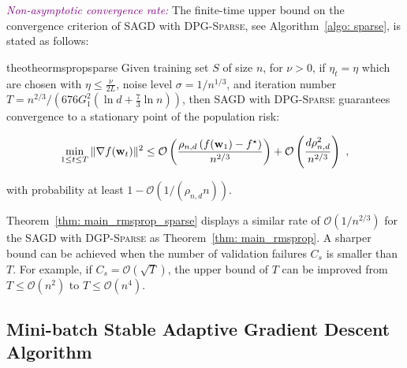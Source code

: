 \documentclass[11pt]{article}
\begin{document}
\textcolor{purple}{\textit{Non-asymptotic convergence rate:}}
The finite-time upper bound on the convergence criterion of \textsc{SAGD} with \textsc{DPG-Sparse}, see Algorithm~\ref{algo: sparse}, is stated as follows:
\begin{restatable}{theo}{theormspropsparse}
\label{thm: main_rmsprop_sparse}
 Given training set $S$ of size $n$, for $\nu >0$, if $\eta_t = \eta$ which are chosen with $\eta \leq \frac{\nu}{2L}$, noise level $\sigma = 1/n^{1/3}$, and iteration number $T = n^{2/3}/\left(676G_1^2(\ln d + \frac{7}{3}\ln n)\right)$, then \textsc{SAGD} with \textsc{DPG-Sparse}  guarantees convergence to a stationary point of the population risk:
  \begin{small}
\begin{equation*}
 \min_{1\leq t\leq T}\|\nabla f(\mathbf{w}_t)\|^2 \leq
\mathcal{O} \left( \frac{\rho_{n,d} \left(f(\mathbf{w}_1) - f^\star \right)}{n^{2/3}} \right) +\mathcal{O} \left( \frac{d \rho_{n,d}^2}{n^{2/3}}\right)~,
\end{equation*}
\end{small}
with probability at least $1-\mathcal{O} \left(1/(\rho_{n,d} n)\right)$.
\end{restatable} 
Theorem~\ref{thm: main_rmsprop_sparse} displays a similar rate of $\mathcal{O}(1/n^{2/3})$ for the \textsc{SAGD} with \textsc{DGP-Sparse} as Theorem~\ref{thm: main_rmsprop}. 
A sharper bound can be achieved when the number of validation failures $C_{s}$ is smaller than $T$. 
For example, if $C_{s} = \mathcal{O}(\sqrt{T})$, the upper bound of $T$ can be improved from $T \leq \mathcal{O}(n^2)$ to $T \leq \mathcal{O}(n^4)$.


\vspace{-0.05in}
\subsection{Mini-batch Stable Adaptive Gradient Descent Algorithm}
\label{mini-batch algorithm}
\vspace{-0.05in}
\end{document}
